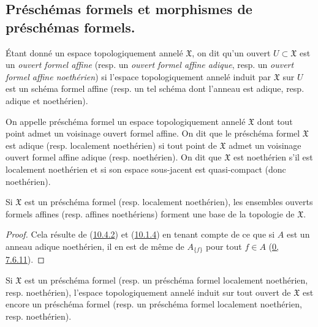\subsection{Préschémas formels et morphismes de préschémas formels.}
\label{subsection:I.10.4-fr}

\begin{env}[10.4.1]
\label{I.10.4.1-fr}
Étant donné un espace topologiquement annelé $\mathfrak{X}$, on dit qu'un
ouvert $U\subset\mathfrak{X}$ est un \emph{ouvert formel affine} (resp. un
\emph{ouvert formel affine adique}, resp. un \emph{ouvert formel affine
noethérien}) si l'espace topologiquement annelé induit par $\mathfrak{X}$
sur $U$ est un schéma formel affine (resp. un tel schéma dont l'anneau est
adique, resp. adique et noethérien).
\end{env}

\begin{definition}[10.4.2]
\label{I.10.4.2-fr}
On appelle préschéma formel un espace topologiquement annelé $\mathfrak{X}$
dont tout point admet un voisinage ouvert formel affine. On dit que le
préschéma formel $\mathfrak{X}$ est adique (resp. localement noethérien) si
tout point de $\mathfrak{X}$ admet un voisinage ouvert formel affine adique
(resp. noethérien). On dit que $\mathfrak{X}$ est noethérien s'il est
localement noethérien et si son espace sous-jacent est quasi-compact (donc
noethérien).
\end{definition}

\begin{proposition}[10.4.3]
\label{I.10.4.3-fr}
Si $\mathfrak{X}$ est un préschéma formel (resp. localement noethérien),
les ensembles ouverts formels affines (resp. affines noethériens) forment
une base de la topologie de $\mathfrak{X}$.
\end{proposition}

\begin{proof}
Cela résulte de (\hyperref[I.10.4.2-fr]{10.4.2}) et
(\hyperref[I.10.1.4-fr]{10.1.4}) en tenant compte de ce que si $A$ est un
anneau adique noethérien, il en est de même de $A_{\{f\}}$ pour tout
$f\in A$ (\hyperref[0.7.6.11-fr]{0, 7.6.11}).
\end{proof}

\begin{corollary}[10.4.4]
\label{I.10.4.4-fr}
Si $\mathfrak{X}$ est un préschéma formel (resp. un préschéma formel
localement noethérien, resp. noethérien), l'espace topologiquement annelé
induit sur tout ouvert de $\mathfrak{X}$ est encore un préschéma formel
(resp. un préschéma formel localement noethérien, resp. noethérien).
\end{corollary}

